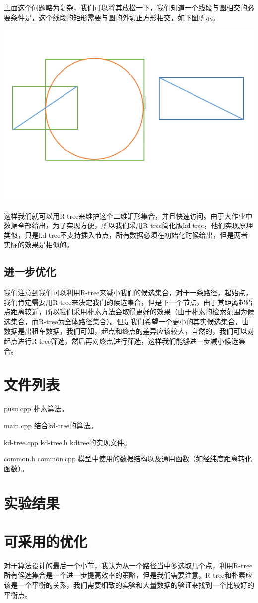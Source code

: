 \documentclass{article}
\begin{document}
上面这个问题略为复杂，我们可以将其放松一下，我们知道一个线段与圆相交的必要条件是，这个线段的矩形需要与圆的外切正方形相交，如下图所示。\par
\includegraphics{example.png}

这样我们就可以用R-tree来维护这个二维矩形集合，并且快速访问。由于大作业中数据全部给出，为了实现方便，所以我们采用R-tree简化版kd-tree，他们实现原理类似，只是kd-tree不支持插入节点，所有数据必须在初始化时候给出，但是两者实际的效果是相似的。\par

\subsection{进一步优化}

我们注意到我们可以利用R-tree来减小我们的候选集合，对于一条路径，起始点，我们肯定需要用R-tree来决定我们的候选集合，但是下一个节点，由于其距离起始点距离较近，所以我们采用朴素方法会取得更好的效果（由于朴素的检索范围为候选集合，而R-tree为全体路径集合）。但是我们希望一个更小的其实候选集合，由数据是出租车数据，我们可知，起点和终点的差异应该较大，自然的，我们可以对起点进行R-tree筛选，然后再对终点进行筛选，这样我们能够进一步减小候选集合。

\section{文件列表}

pusu.cpp 朴素算法。\par

main.cpp 结合kd-tree的算法。\par

kd-tree.cpp kd-tree.h kdtree的实现文件。\par

common.h common.cpp 模型中使用的数据结构以及通用函数（如经纬度距离转化函数）。\par

\section{实验结果}

\section{可采用的优化}

对于算法设计的最后一个小节，我认为从一个路径当中多选取几个点，利用R-tree所有候选集合是一个进一步提高效率的策略，但是我们需要注意，R-tree和朴素应该是一个平衡的关系，我们需要细致的实验和大量数据的验证来找到一个比较好的平衡点。
\end{document}
